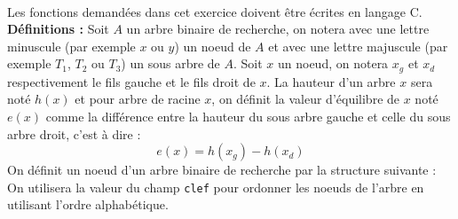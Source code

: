 \documentclass[11pt,a4paper]{article}
\begin{document}
\begin{Exercise}[title = {Implémentation d'un tableau associatif}, origin = {\bac \; {\sc ccmp 2025}, {\sc mpi} } ]\\
Les fonctions demandées dans cet exercice doivent être écrites en langage C. \\
{\bf Définitions :} Soit $A$ un arbre binaire de recherche, on notera avec une lettre minuscule (par exemple $x$ ou $y$) un noeud de $A$ et avec une lettre majuscule (par exemple $T_1$, $T_2$ ou $T_3$) un sous arbre de $A$. Soit $x$ un noeud, on notera $x_g$ et $x_d$ respectivement le fils gauche et le fils droit de $x$. La hauteur d'un arbre $x$ sera noté $h(x)$ et pour arbre de racine $x$, on définit la valeur d'équilibre de $x$ noté $e(x)$ comme la différence entre la hauteur du sous arbre gauche et celle du sous arbre droit, c'est à dire :
$$ e(x) = h(x_g) - h(x_d)$$
On définit un noeud d'un arbre binaire de recherche par la structure suivante :
On utilisera la valeur du champ {\tt clef} pour ordonner les noeuds de l'arbre en utilisant l'ordre alphabétique.


\end{Exercise}
\end{document}
